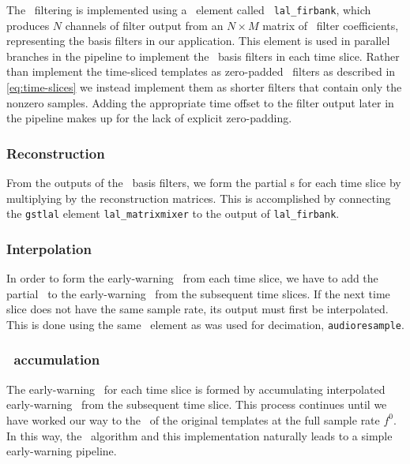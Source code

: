 The \fir\ filtering is implemented using a \gstlal\ element called {\tt
lal\_firbank}, which produces $N$ channels of filter output from an $N\times M$ matrix of
\fir\ filter coefficients, representing the \SVD{} basis filters in our application.  This element is used in parallel branches in the
pipeline to implement the \SVD\ basis filters in each time
slice.  Rather than implement the time-sliced templates as zero-padded \fir\
filters as described in \eqref{eq:time-slices} we instead implement them as shorter
filters that contain only the nonzero samples.  Adding the appropriate time
offset to the filter output later in the pipeline makes up for the lack of
explicit zero-padding.

\subsubsection{Reconstruction}

From the outputs of the \SVD\ basis filters, we form the partial \SNR{}s for each time 
slice by multiplying by the reconstruction matrices.  This is accomplished by connecting 
the \texttt{gstlal} element \texttt{lal\_matrixmixer} to the output of
\texttt{lal\_firbank}.

\subsubsection{Interpolation}

In order to form the early-warning \SNR\ from each time slice, we have to add
the partial \SNR\ to the early-warning \SNR\ from the subsequent time slices.
If the next time slice does not have the same sample rate, its output must
first be interpolated.  This is done using the same \gstreamer\ element as was
used for decimation, {\tt audioresample}.  

\subsubsection{\SNR\ accumulation}

The early-warning \SNR\ for each time slice is formed by accumulating
interpolated early-warning \SNR\ from the subsequent time slice.  This process
continues until we have worked our way to the \SNR\ of the original templates
at the full sample rate $f^0$.  In this way, the \lloid\ algorithm and this
implementation naturally leads to a simple early-warning pipeline.
